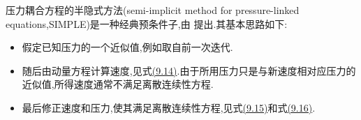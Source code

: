 \begin{example}
\label{ex:chapter9-simple}
压力耦合方程的半隐式方法(semi-implicit method for pressure-linked equations,SIMPLE)是一种经典预条件子,由 \textcite{Patankar1980} 提出.其基本思路如下:
\begin{itemize}
  \item 假定已知压力的一个近似值,例如取自前一次迭代.
  \item 随后由动量方程计算速度,见式\hyperref[eq:chapter9-simple-velocity]{(9.14)}.由于所用压力只是与新速度相对应压力的近似值,所得速度通常不满足离散连续性方程.
  \item 最后修正速度和压力,使其满足离散连续性方程,见式\hyperref[eq:chapter9-simple-pressure]{(9.15)}和式\hyperref[eq:chapter9-simple-pressure-update]{(9.16)}.
\end{itemize}


\end{example}

